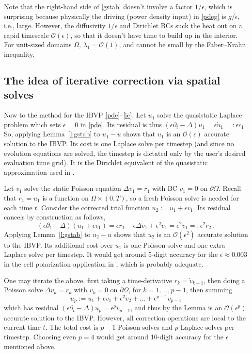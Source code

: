\documentclass[10pt]{article}
\newcommand{\be}{\begin{equation}}
\newcommand{\ee}{\end{equation}}
\newcommand{\bigO}{{\mathcal O}}
\newcommand{\pO}{{\partial\Omega}}
\newcommand{\eps}{\epsilon}
\newcommand{\dt}{\partial_t}
\begin{document}
Note that the right-hand side of \eqref{gstab} doesn't involve a factor $1/\eps$,
which is surprising because physically the driving
(power density input)
in \eqref{pdeg} is $g/\eps$, i.e., large.
However, the diffusivity $1/\eps$ and Dirichlet BCs suck
the heat out on a rapid timescale $\bigO(\eps)$, so that it doesn't have time to build up in the interior.
For unit-sized domains $\Omega$, $\lambda_1=\bigO(1)$, and cannot be
small by the Faber--Krahn inequality.

\subsection{The idea of iterative correction via spatial solves}

Now to the method for the IBVP \eqref{pde}--\eqref{ic}.
Let $u_1$ solve the quasistatic Laplace problem which sets $\eps=0$
in \eqref{pde}.
Its residual is thus $(\eps\dt-\Delta)u_1 = \eps \dot u_1 =: \eps r_1$.
So, applying Lemma~\ref{l:gstab} to $u_1-u$
shows that $u_1$ is an $\bigO(\eps)$ accurate solution
to the IBVP.
Its cost is one Laplace solve per timestep (and since no evolution
equations are solved, the timestep is dictated only by the user's desired
evaluation time grid).
It is the Dirichlet equivalent of the quasistatic approximation
used in \cite{diegmiller18}.

Let $v_1$ solve the static Poisson equation $\Delta v_1 = r_1$ with
BC $v_1=0$ on $\pO$. Recall that $r_1=\dot u_1$ is a function
on $\Omega \times (0,T)$, so a fresh Poisson solve is needed for each time $t$.
Consider the corrected trial function
$u_2 := u_1 + \eps v_1$. Its residual cancels by construction as follows,
$$
(\eps\dt-\Delta)(u_1 +\eps v_1) = \eps r_1 - \eps \Delta v_1 +\eps^2 \dot v_1 =
\eps^2 \dot v_1 =: \eps^2 r_2~.
$$
Applying Lemma~\ref{l:gstab} to $u_2-u$
shows that $u_2$ is an $\bigO(\eps^2)$ accurate solution
to the IBVP. Its additional cost over $u_1$ is one Poisson solve
and one extra Laplace solve per timestep.
It would get around 5-digit accuracy for the
$\eps\approx 0.003$ in the cell polarization application in \cite{diegmiller18},
which is probably adequate.

One may iterate the above, first taking a time-derivative $r_{k} = \dot v_{k-1}$,
then doing a Poisson solve $\Delta v_k = r_k$
with $v_k=0$ on $\pO$, for $k=1,\dots,p-1$,
then summing
\be
u_p := u_1 + \eps v_1 + \eps^2 v_2 + \dots + \eps^{p-1} v_{p-1}
\label{up}
\ee
which has residual $(\eps\dt-\Delta)u_p = \eps^p \dot v_{p-1}$,
and thus by the Lemma is an $\bigO(\eps^p)$ accurate solution
to the IBVP.
However, all correction operations are local to the current time $t$.
The total cost is $p-1$ Poisson solves and $p$ Laplace solves per timestep.
Choosing even $p=4$ would get around 10-digit accuracy for the $\eps$
mentioned above.
\end{document}
